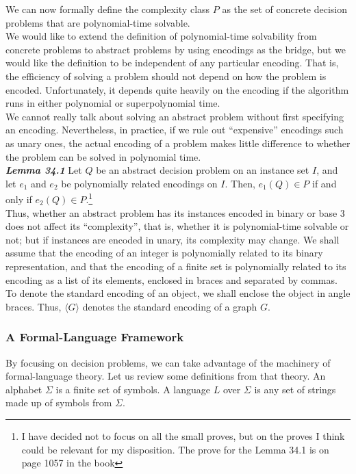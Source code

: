 We can now formally define the complexity class $P$ as the set of concrete decision problems that are polynomial-time solvable.\\

We would like to extend the definition of polynomial-time solvability from concrete problems to abstract problems by using encodings as the bridge, but we would like the definition to be independent of any particular encoding. That is, the efficiency of solving a problem should not depend on how the problem is encoded. Unfortunately, it depends quite heavily on the encoding if the algorithm runs in either polynomial or superpolynomial time. \\

We cannot really talk about solving an abstract problem without first specifying an encoding. Nevertheless, in practice, if we rule out ``expensive'' encodings such as unary ones, the actual encoding of a problem makes little difference to whether the problem can be solved in polynomial time.\\

\textbf{\textit{Lemma 34.1}} Let $Q$ be an abstract decision problem on an instance set $I$, and let $e_1$ and $e_2$ be polynomially related encodings on $I$. Then, $e_1(Q) \in P$ if and only if $e_2(Q) \in P$.\footnote{I have decided not to focus on all the small proves, but on the proves I think could be relevant for my disposition. The prove for the Lemma 34.1 is on page 1057 in the book}\\

Thus, whether an abstract problem has its instances encoded in binary or base 3 does not affect its ``complexity'', that is, whether it is polynomial-time solvable or not; but if instances are encoded in unary, its complexity may change. We shall assume that the encoding of an integer is polynomially related to its binary representation, and that the encoding of a finite set is polynomially related to its encoding as a list of its elements, enclosed in braces and separated by commas. To denote the standard encoding of an object, we shall enclose the object in angle braces. Thus, $\langle G \rangle$ denotes the standard encoding of a graph $G$.

\subsubsection{A Formal-Language Framework}
By focusing on decision problems, we can take advantage of the machinery of formal-language theory. Let us review some definitions from that theory. An alphabet $\Sigma$ is a finite set of symbols. A language $L$ over $\Sigma$ is any set of strings made up of symbols from $\Sigma$.\\

